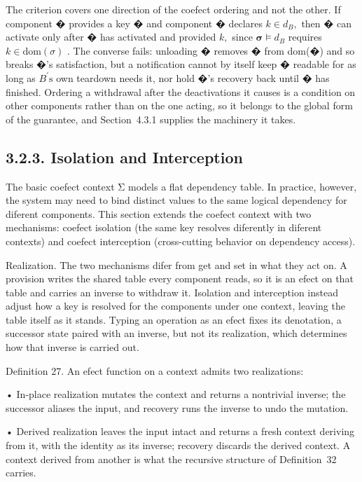 \documentclass[
  10
]{article}
\begin{document}
The criterion covers one direction of the coefect ordering and not the
other. If component � provides a key � and component � declares
\(k \in d _ { B } ,\) then � can activate only after � has activated and
provided \(k ,\) since \({ \boldsymbol { \sigma } } \models d _ { B }\)
requires \(k \in \mathrm { d o m } ( \sigma )\) . The converse fails:
unloading � removes � from dom(�) and so breaks �'s satisfaction, but a
notification cannot by itself keep � readable for as long as
\(B ^ { \prime } { \mathrm { s } }\) own teardown needs it, nor hold �'s
recovery back until � has finished. Ordering a withdrawal after the
deactivations it causes is a condition on other components rather than
on the one acting, so it belongs to the global form of the guarantee,
and Section~4.3.1 supplies the machinery it takes.

\subsection{3.2.3. Isolation and
Interception}\label{isolation-and-interception}

The basic coefect context Σ models a flat dependency table. In practice,
however, the system may need to bind distinct values to the same logical
dependency for diferent components. This section extends the coefect
context with two mechanisms: coefect isolation (the same key resolves
diferently in diferent contexts) and coefect interception (cross-cutting
behavior on dependency access).

Realization. The two mechanisms difer from get and set in what they act
on. A provision writes the shared table every component reads, so it is
an efect on that table and carries an inverse to withdraw it. Isolation
and interception instead adjust how a key is resolved for the components
under one context, leaving the table itself as it stands. Typing an
operation as an efect fixes its denotation, a successor state paired
with an inverse, but not its realization, which determines how that
inverse is carried out.

Definition 27. An efect function on a context admits two realizations:

• In-place realization mutates the context and returns a nontrivial
inverse; the successor aliases the input, and recovery runs the inverse
to undo the mutation.

• Derived realization leaves the input intact and returns a fresh
context deriving from it, with the identity as its inverse; recovery
discards the derived context. A context derived from another is what the
recursive structure of Definition~32 carries.
\end{document}
